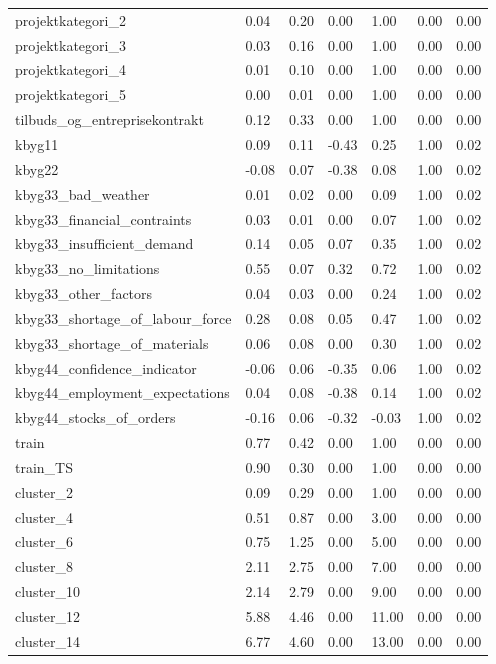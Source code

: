 \begin{landscape}
\begin{longtable}[h!]{lllllll}
projektkategori_2 & 0.04 & 0.20 & 0.00 & 1.00 & 0.00 & 0.00 \\
projektkategori_3 & 0.03 & 0.16 & 0.00 & 1.00 & 0.00 & 0.00 \\
projektkategori_4 & 0.01 & 0.10 & 0.00 & 1.00 & 0.00 & 0.00 \\
projektkategori_5 & 0.00 & 0.01 & 0.00 & 1.00 & 0.00 & 0.00 \\
tilbuds_og_entreprisekontrakt & 0.12 & 0.33 & 0.00 & 1.00 & 0.00 & 0.00 \\
kbyg11 & 0.09 & 0.11 & -0.43 & 0.25 & 1.00 & 0.02 \\
kbyg22 & -0.08 & 0.07 & -0.38 & 0.08 & 1.00 & 0.02 \\
kbyg33_bad_weather & 0.01 & 0.02 & 0.00 & 0.09 & 1.00 & 0.02 \\
kbyg33_financial_contraints & 0.03 & 0.01 & 0.00 & 0.07 & 1.00 & 0.02 \\
kbyg33_insufficient_demand & 0.14 & 0.05 & 0.07 & 0.35 & 1.00 & 0.02 \\
kbyg33_no_limitations & 0.55 & 0.07 & 0.32 & 0.72 & 1.00 & 0.02 \\
kbyg33_other_factors & 0.04 & 0.03 & 0.00 & 0.24 & 1.00 & 0.02 \\
kbyg33_shortage_of_labour_force & 0.28 & 0.08 & 0.05 & 0.47 & 1.00 & 0.02 \\
kbyg33_shortage_of_materials & 0.06 & 0.08 & 0.00 & 0.30 & 1.00 & 0.02 \\
kbyg44_confidence_indicator & -0.06 & 0.06 & -0.35 & 0.06 & 1.00 & 0.02 \\
kbyg44_employment_expectations & 0.04 & 0.08 & -0.38 & 0.14 & 1.00 & 0.02 \\
kbyg44_stocks_of_orders & -0.16 & 0.06 & -0.32 & -0.03 & 1.00 & 0.02 \\
train & 0.77 & 0.42 & 0.00 & 1.00 & 0.00 & 0.00 \\
train_TS & 0.90 & 0.30 & 0.00 & 1.00 & 0.00 & 0.00 \\
cluster_2 & 0.09 & 0.29 & 0.00 & 1.00 & 0.00 & 0.00 \\
cluster_4 & 0.51 & 0.87 & 0.00 & 3.00 & 0.00 & 0.00 \\
cluster_6 & 0.75 & 1.25 & 0.00 & 5.00 & 0.00 & 0.00 \\
cluster_8 & 2.11 & 2.75 & 0.00 & 7.00 & 0.00 & 0.00 \\
cluster_10 & 2.14 & 2.79 & 0.00 & 9.00 & 0.00 & 0.00 \\
cluster_12 & 5.88 & 4.46 & 0.00 & 11.00 & 0.00 & 0.00 \\
cluster_14 & 6.77 & 4.60 & 0.00 & 13.00 & 0.00 & 0.00 \\
\end{longtable}\end{landscape}
